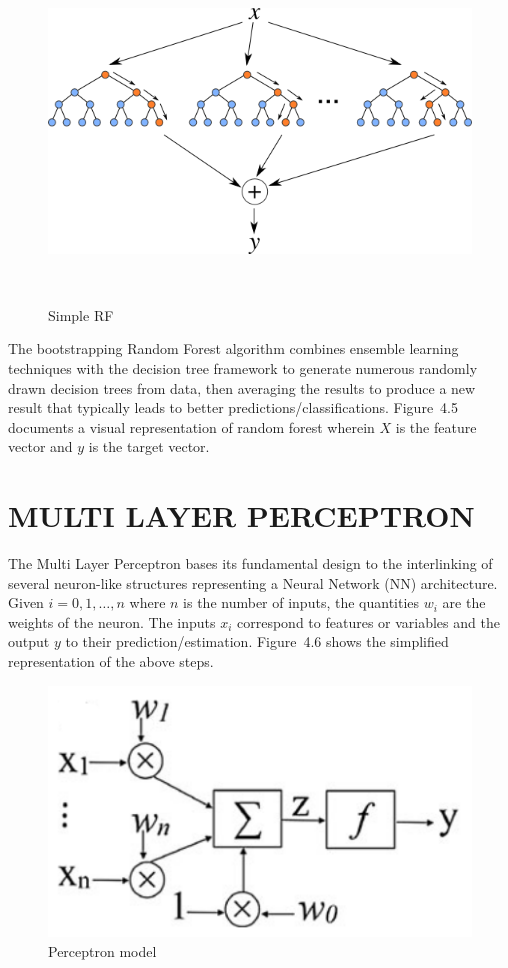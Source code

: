 \begin{figure}[H]
\centering
\includegraphics[width=1\textwidth, height=9cm]{./figures/rf.png}
\caption{Simple RF}
\label{fig1}
\end{figure}

The bootstrapping Random Forest algorithm \cite{B} combines ensemble learning techniques with the decision tree framework to generate numerous randomly drawn decision trees from data, then averaging the results to produce a new result that typically leads to better predictions/classifications. Figure~4.5 documents a visual
representation of random forest wherein $X$ is the feature
vector and $y$ is the target vector.

\section{MULTI LAYER PERCEPTRON}

The Multi Layer Perceptron bases its fundamental design to the
interlinking of several neuron-like structures representing a Neural
Network (NN) architecture. Given $i = 0,1,\ldots,n$ where $n$ is the
number of inputs, the quantities $w_{i}$ are the weights of the
neuron. The inputs $x_{i}$ correspond to features or variables and the
output $y$ to their prediction/estimation. Figure~4.6 shows the
simplified representation of the above steps.

\begin{figure}[h]
\centering
\includegraphics[]{./figures/perceptron.png}
\caption{Perceptron model}
\label{fig1}
\end{figure}


